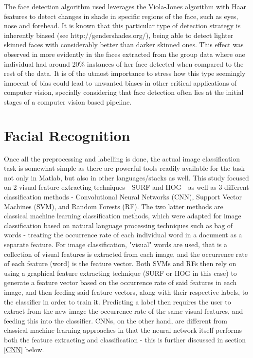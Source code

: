 \documentclass[11pt]{article}
\begin{document}
        \label{sec:face_labeling:outliers:difficulties}
            The face detection algorithm used leverages the Viola-Jones algorithm with Haar features to detect changes in shade in specific regions of the face, such as eyes, nose and forehead. It is known that this particular type of detection strategy is inherently biased (see http://gendershades.org/), being able to detect lighter skinned faces with considerably better than darker skinned ones. This effect was observed in more evidently in the faces extracted from the group data where one individual had around 20\% instances of her face detected when compared to the rest of the data. It is of the utmost importance to stress how this type seemingly innocent of bias could lead to unwanted biases in other critical applications of computer vision, specially considering that face detection often lies at the initial stages of a computer vision based pipeline.



\section{Facial Recognition}
    Once all the preprocessing and labelling is done, the actual image classification task is somewhat simple as there are powerful tools readily available for the task not only in Matlab, but also in other languages/stacks as well. This study focused on 2 visual feature extracting techniques - SURF and HOG - as well as 3 different classification methods - Convolutional Neural Networks (CNN), Support Vector Machines (SVM), and Random Forests (RF). The two latter methods are classical machine learning classification methods, which were adapted for image classification based on natural language processing techniques such as bag of words - treating the occurrence rate of each individual word in a document as a separate feature. For image classification, "visual" words are used, that is a collection of visual features is extracted from each image, and the occurrence rate of each feature (word) is the feature vector. Both SVMs and RFs then rely on using a graphical feature extracting technique (SURF or HOG in this case) to generate a feature vector based on the occurrence rate of said features in each image, and then feeding said feature vectors, along with their respective labels, to the classifier in order to train it. Predicting a label then requires the user to extract from the new image the occurrence rate of the same visual features, and feeding this into the classifier. CNNs, on the other hand, are different from classical machine learning approaches in that the neural network itself performs both the feature extracting and classification - this is further discussed in section \ref{CNN} below.
\end{document}

